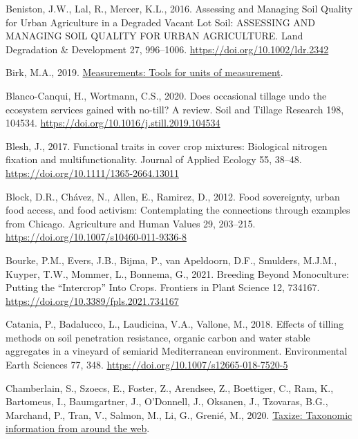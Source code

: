 \documentclass[
  12pt,
]{article}
\newlength{\cslhangindent}
\newlength{\cslentryspacingunit} %
\newenvironment{CSLReferences}[2] %
 {%
  \setlength{\parindent}{0pt}
  \ifodd #1
  \let\oldpar\par
  \def\par{\hangindent=\cslhangindent\oldpar}
  \fi
  \setlength{\parskip}{#2\cslentryspacingunit}
 }%
 {}
\begin{document}
\begin{CSLReferences}{1}{0}
\leavevmode{}%
Beniston, J.W., Lal, R., Mercer, K.L., 2016. Assessing and {Managing Soil Quality} for {Urban Agriculture} in a {Degraded Vacant Lot Soil}: {ASSESSING AND MANAGING SOIL QUALITY FOR URBAN AGRICULTURE}. Land Degradation \& Development 27, 996--1006. \url{https://doi.org/10.1002/ldr.2342}

\leavevmode{}%
Birk, M.A., 2019. \href{https://CRAN.R-project.org/package=measurements}{Measurements: Tools for units of measurement}.

\leavevmode{}%
Blanco-Canqui, H., Wortmann, C.S., 2020. Does occasional tillage undo the ecosystem services gained with no-till? {A} review. Soil and Tillage Research 198, 104534. \url{https://doi.org/10.1016/j.still.2019.104534}

\leavevmode{}%
Blesh, J., 2017. Functional traits in cover crop mixtures: {Biological} nitrogen fixation and multifunctionality. Journal of Applied Ecology 55, 38--48. \url{https://doi.org/10.1111/1365-2664.13011}

\leavevmode{}%
Block, D.R., Chávez, N., Allen, E., Ramirez, D., 2012. Food sovereignty, urban food access, and food activism: Contemplating the connections through examples from {Chicago}. Agriculture and Human Values 29, 203--215. \url{https://doi.org/10.1007/s10460-011-9336-8}

\leavevmode{}%
Bourke, P.M., Evers, J.B., Bijma, P., van Apeldoorn, D.F., Smulders, M.J.M., Kuyper, T.W., Mommer, L., Bonnema, G., 2021. Breeding {Beyond Monoculture}: {Putting} the {``{Intercrop}''} {Into Crops}. Frontiers in Plant Science 12, 734167. \url{https://doi.org/10.3389/fpls.2021.734167}

\leavevmode{}%
Catania, P., Badalucco, L., Laudicina, V.A., Vallone, M., 2018. Effects of tilling methods on soil penetration resistance, organic carbon and water stable aggregates in a vineyard of semiarid {Mediterranean} environment. Environmental Earth Sciences 77, 348. \url{https://doi.org/10.1007/s12665-018-7520-5}

\leavevmode{}%
Chamberlain, S., Szoecs, E., Foster, Z., Arendsee, Z., Boettiger, C., Ram, K., Bartomeus, I., Baumgartner, J., O'Donnell, J., Oksanen, J., Tzovaras, B.G., Marchand, P., Tran, V., Salmon, M., Li, G., Grenié, M., 2020. \href{https://github.com/ropensci/taxize}{Taxize: Taxonomic information from around the web}.


\end{CSLReferences}
\end{document}
